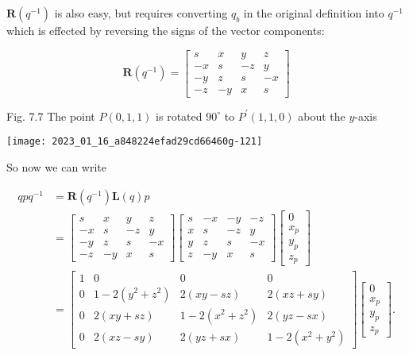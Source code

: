 $\mathbf{R}\left(q^{-1}\right)$ is also easy, but requires converting $q_{b}$ in the original definition into $q^{-1}$ which is effected by reversing the signs of the vector components:

$$
\mathbf{R}\left(q^{-1}\right)=\left[\begin{array}{cccc}
s & x & y & z \\
-x & s & -z & y \\
-y & z & s & -x \\
-z & -y & x & s
\end{array}\right]
$$

Fig. 7.7 The point $P(0,1,1)$ is rotated $90^{\circ}$ to $P^{\prime}(1,1,0)$ about the $y$-axis

\begin{center}
\texttt{[image: 2023\_01\_16\_a848224efad29cd66460g-121]}
\end{center}

So now we can write

$$
\begin{aligned}
q p q^{-1} & =\mathbf{R}\left(q^{-1}\right) \mathbf{L}(q) p \\
& =\left[\begin{array}{cccc}
s & x & y & z \\
-x & s & -z & y \\
-y & z & s & -x \\
-z & -y & x & s
\end{array}\right]\left[\begin{array}{cccc}
s & -x & -y & -z \\
x & s & -z & y \\
y & z & s & -x \\
z & -y & x & s
\end{array}\right]\left[\begin{array}{c}
0 \\
x_{p} \\
y_{p} \\
z_{p}
\end{array}\right] \\
& =\left[\begin{array}{cccc}
1 & 0 & 0 & 0 \\
0 & 1-2\left(y^{2}+z^{2}\right) & 2(x y-s z) & 2(x z+s y) \\
0 & 2(x y+s z) & 1-2\left(x^{2}+z^{2}\right) & 2(y z-s x) \\
0 & 2(x z-s y) & 2(y z+s x) & 1-2\left(x^{2}+y^{2}\right)
\end{array}\right]\left[\begin{array}{c}
0 \\
x_{p} \\
y_{p} \\
z_{p}
\end{array}\right] .
\end{aligned}
$$

